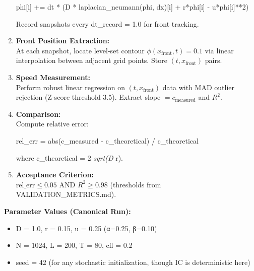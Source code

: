 \documentclass[
]{article}
\newenvironment{Shaded}{}{}
\newcommand{\BuiltInTok}[1]{\textcolor[rgb]{0.00,0.50,0.00}{#1}}
\newcommand{\DecValTok}[1]{\textcolor[rgb]{0.25,0.63,0.44}{#1}}
\newcommand{\NormalTok}[1]{#1}
\newcommand{\OperatorTok}[1]{\textcolor[rgb]{0.40,0.40,0.40}{#1}}
\providecommand{\tightlist}{%
  \setlength{\itemsep}{0pt}\setlength{\parskip}{0pt}}
\begin{document}
\begin{enumerate}
\begin{Shaded}
\begin{Highlighting}[]
\NormalTok{phi[i] }\OperatorTok{+=}\NormalTok{ dt }\OperatorTok{*}\NormalTok{ (D }\OperatorTok{*}\NormalTok{ laplacian\_neumann(phi, dx)[i] }\OperatorTok{+}\NormalTok{ r}\OperatorTok{*}\NormalTok{phi[i] }\OperatorTok{{-}}\NormalTok{ u}\OperatorTok{*}\NormalTok{phi[i]}\OperatorTok{**}\DecValTok{2}\NormalTok{)}
\end{Highlighting}
\end{Shaded}

  Record snapshots every dt\_record = 1.0 for front tracking.
\item
  \textbf{Front Position Extraction:}\\
  At each snapshot, locate level-set contour
  \(\phi(x_{\text{front}}, t) = 0.1\) via linear interpolation between
  adjacent grid points. Store \((t, x_{\text{front}})\) pairs.
\item
  \textbf{Speed Measurement:}\\
  Perform robust linear regression on \((t, x_{\text{front}})\) data
  with MAD outlier rejection (Z-score threshold 3.5). Extract slope
  \(= c_{\text{measured}}\) and \(R^{2}\).
\item
  \textbf{Comparison:}\\
  Compute relative error:

\begin{Shaded}
\begin{Highlighting}[]
\NormalTok{rel\_err }\OperatorTok{=} \BuiltInTok{abs}\NormalTok{(c\_measured }\OperatorTok{{-}}\NormalTok{ c\_theoretical) }\OperatorTok{/}\NormalTok{ c\_theoretical}
\end{Highlighting}
\end{Shaded}

  where c\_theoretical = 2 \emph{sqrt(D} r).
\item
  \textbf{Acceptance Criterion:}\\
  \(\mathrm{rel\_err} \le 0.05\) AND \(R^{2} \ge 0.98\) (thresholds from
  VALIDATION\_METRICS.md).
\end{enumerate}

\textbf{Parameter Values (Canonical Run):}

\begin{itemize}
\tightlist
\item
  D = 1.0, r = 0.15, u = 0.25 (α=0.25, β=0.10)
\item
  N = 1024, L = 200, T = 80, cfl = 0.2
\item
  seed = 42 (for any stochastic initialization, though IC is
  deterministic here)
\end{itemize}
\end{document}
